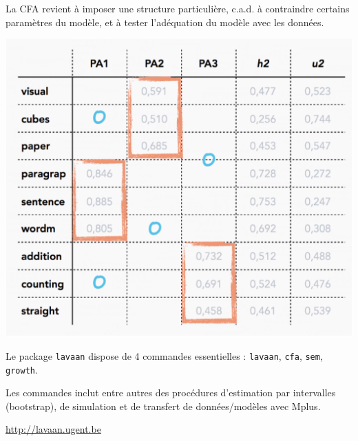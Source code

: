 
\begin{minipage}{0.45\textwidth}
La CFA revient à imposer une structure particulière, c.a.d. à contraindre certains
paramètres du modèle, et à tester l'adéquation du modèle avec les données.
\end{minipage}\hfill
\begin{minipage}{0.5\textwidth}
\centerline{\includegraphics[scale=.5]{./figs/cfa.eps}}
\end{minipage}


Le package \texttt{lavaan}\autocite{rosseel12} dispose de 4 commandes essentielles :
\texttt{lavaan}, \texttt{cfa}, \texttt{sem}, \texttt{growth}.

Les commandes inclut entre autres des procédures d'estimation par intervalles
(bootstrap), de simulation et de transfert de données/modèles avec
Mplus\autocite{beaujean13,beaujean14}.

{\centering \url{http://lavaan.ugent.be}\par}




